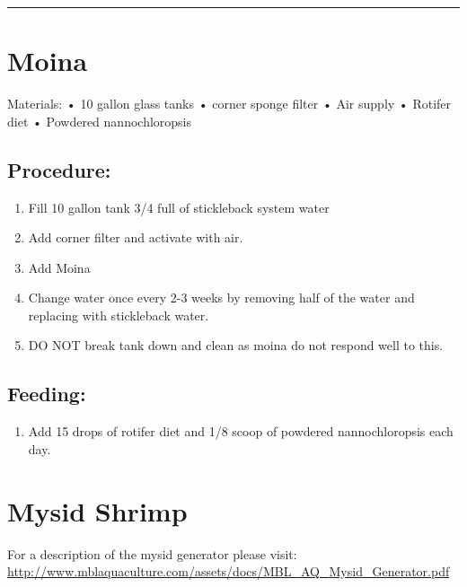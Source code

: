 \documentclass[
]{book}
\providecommand{\tightlist}{%
  \setlength{\itemsep}{0pt}\setlength{\parskip}{0pt}}
\begin{document}
\begin{center}\rule{0.5\linewidth}{0.5pt}\end{center}

\hypertarget{moina}{%
\section{Moina}\label{moina}}

Materials:
• 10 gallon glass tanks
• corner sponge filter
• Air supply
• Rotifer diet
• Powdered nannochloropsis

\hypertarget{procedure-6}{%
\subsection{Procedure:}\label{procedure-6}}

\begin{enumerate}
\def\labelenumi{\arabic{enumi}.}
\tightlist
\item
  Fill 10 gallon tank 3/4 full of stickleback system water
\item
  Add corner filter and activate with air.
\item
  Add Moina
\item
  Change water once every 2-3 weeks by removing half of the water and replacing with stickleback water.
\item
  DO NOT break tank down and clean as moina do not respond well to this.
\end{enumerate}

\hypertarget{feeding}{%
\subsection{\texorpdfstring{\textbf{Feeding}:}{Feeding:}}\label{feeding}}

\begin{enumerate}
\def\labelenumi{\arabic{enumi}.}
\setcounter{enumi}{5}
\tightlist
\item
  Add 15 drops of rotifer diet and 1/8 scoop of powdered nannochloropsis each day.
\end{enumerate}

\hypertarget{mysid-shrimp}{%
\section{Mysid Shrimp}\label{mysid-shrimp}}

For a description of the mysid generator please visit:
\url{http://www.mblaquaculture.com/assets/docs/MBL_AQ_Mysid_Generator.pdf}
\end{document}
